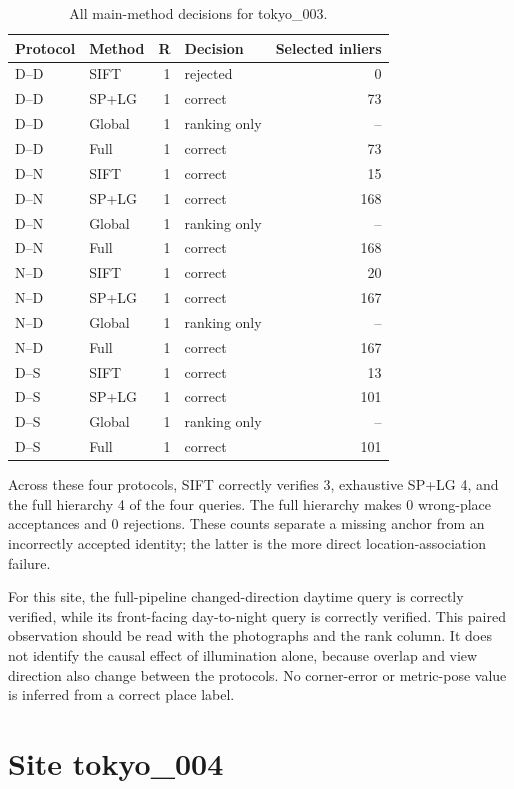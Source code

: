 \begin{table}[H]\centering\small
\caption{All main-method decisions for tokyo\_003.}\label{tab:tokyo-site-3}
\begin{tabular}{llrlr}\toprule
Protocol & Method & R & Decision & Selected inliers \\
\midrule
D--D & SIFT & 1 & rejected & 0 \\
D--D & SP+LG & 1 & correct & 73 \\
D--D & Global & 1 & ranking only & -- \\
D--D & Full & 1 & correct & 73 \\
D--N & SIFT & 1 & correct & 15 \\
D--N & SP+LG & 1 & correct & 168 \\
D--N & Global & 1 & ranking only & -- \\
D--N & Full & 1 & correct & 168 \\
N--D & SIFT & 1 & correct & 20 \\
N--D & SP+LG & 1 & correct & 167 \\
N--D & Global & 1 & ranking only & -- \\
N--D & Full & 1 & correct & 167 \\
D--S & SIFT & 1 & correct & 13 \\
D--S & SP+LG & 1 & correct & 101 \\
D--S & Global & 1 & ranking only & -- \\
D--S & Full & 1 & correct & 101 \\
\bottomrule\end{tabular}\end{table}


Across these four protocols, SIFT correctly verifies 3, exhaustive SP+LG 4, and the full hierarchy 4 of the four queries. The full hierarchy makes 0 wrong-place acceptances and 0 rejections. These counts separate a missing anchor from an incorrectly accepted identity; the latter is the more direct location-association failure.

For this site, the full-pipeline changed-direction daytime query is correctly verified, while its front-facing day-to-night query is correctly verified. This paired observation should be read with the photographs and the rank column. It does not identify the causal effect of illumination alone, because overlap and view direction also change between the protocols. No corner-error or metric-pose value is inferred from a correct place label.

\section{Site tokyo\_004}

